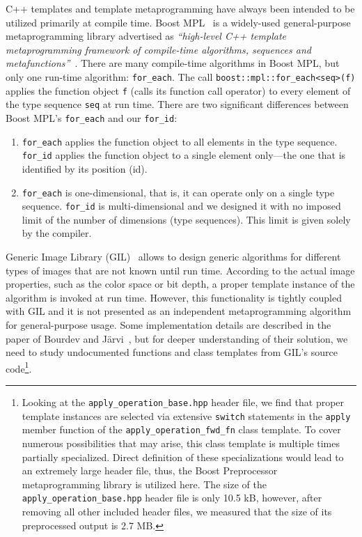 \documentclass[10pt,a4paper]{article}
\theoremstyle{definition}\newtheorem{problem}{Problem}
\providecommand{\forid}{\texttt{for\_id}\xspace}
\providecommand{\foreach}{\texttt{for\_each}\xspace}
\begin{document}
C++ templates and template metaprogramming have always been intended to be utilized primarily at compile time. Boost MPL~\cite{RefWorks:53} is a widely-used general-purpose metaprogramming library advertised as \textit{``high-level C++ template meta\-programming framework of compile-time algorithms, sequences and metafunctions''}~\cite{RefWorks:85}. There are many compile-time algorithms in Boost MPL, but only one run-time algorithm: \foreach. The call 
\texttt{boost::mpl::for\_each<seq>(f)}
applies the function object \texttt{f} (calls its function call operator) to every element of the type sequence \texttt{seq} at run time. There are two significant differences between Boost MPL's \foreach and our \forid:
\begin{enumerate}

\item \foreach applies the function object to all elements in the type sequence. \forid applies the function object to a single element only---the one that is identified by its position (id).

\item \foreach is one-dimensional, that is, it can operate only on a single type sequence. \forid is multi-dimensional
and we designed it with no imposed limit of the number of dimensions (type sequences). This limit is given solely by the compiler.

\end{enumerate}

Generic Image Library (GIL)~\cite{RefWorks:86} allows to design generic algorithms for different types of images that are not known until run time. According to the actual image properties, such as the color space or bit depth, a proper template instance of the algorithm is invoked at run time. However, this functionality is tightly coupled with GIL and it is not presented as an independent metaprogramming algorithm for general-purpose usage. Some implementation details are described in the paper of Bourdev and J\"arvi~\cite{RefWorks:60}, but for deeper understanding of their solution, we need to study undocumented functions and class templates from GIL's source code\footnote{Looking at the \texttt{apply\_operation\_base.hpp} header file, we find that proper template instances are selected via extensive \texttt{switch} statements in the \texttt{apply} member function of the \texttt{apply\_ope\-ra\-tion\_fwd\_fn} class template. To cover numerous possibilities that may arise, this class template is multiple times partially specialized. Direct definition of these specializations would lead to an extremely large header file, thus, the Boost Preprocessor metaprogramming library is utilized here. The size of the \texttt{apply\_operation\_base.hpp} header file is only 10.5 kB, however, after removing all other included header files, we measured that the size of its preprocessed output is 2.7 MB.
}.
\end{document}
